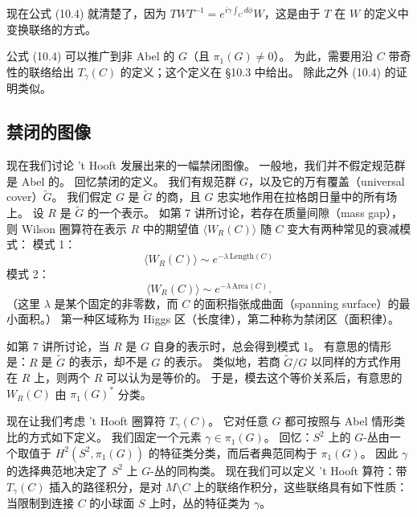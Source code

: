 现在公式 (10.4) 就清楚了，因为 $TWT^{-1}=e^{i\gamma\int_C d\phi}W$，这是由于 $T$ 在 $W$ 的定义中变换联络的方式。

公式 (10.4) 可以推广到非 Abel 的 $G$（且 $\pi_1(G)\neq0$）。
为此，需要用沿 $C$ 带奇性的联络给出 $T_\gamma(C)$ 的定义；这个定义在 §10.3 中给出。
除此之外 (10.4) 的证明类似。

\subsection{禁闭的图像}

现在我们讨论 't Hooft 发展出来的一幅禁闭图像。
一般地，我们并不假定规范群是 Abel 的。
回忆禁闭的定义。
我们有规范群 $G$，以及它的万有覆盖（universal cover）$\tilde G$。
我们假定 $G$ 是 $\tilde G$ 的商，且 $G$ 忠实地作用在拉格朗日量中的所有场上。
设 $R$ 是 $\tilde G$ 的一个表示。
如第 7 讲所讨论，若存在质量间隙（mass gap），则 Wilson 圈算符在表示 $R$ 中的期望值 $\langle W_R(C)\rangle$ 随 $C$ 变大有两种常见的衰减模式：
模式 1：
\begin{equation}\tag{10.8}\label{eq:10-8}
\langle W_R(C)\rangle\sim e^{-\lambda\,\mathrm{Length}(C)}
\end{equation}
模式 2：
\begin{equation}\tag{10.9}\label{eq:10-9}
\langle W_R(C)\rangle\sim e^{-\lambda\,\mathrm{Area}(C)}.
\end{equation}
（这里 $\lambda$ 是某个固定的非零数，而 $C$ 的面积指张成曲面（spanning surface）的最小面积。）
第一种区域称为 Higgs 区（长度律），第二种称为禁闭区（面积律）。


如第 7 讲所讨论，当 $R$ 是 $G$ 自身的表示时，总会得到模式 1。
有意思的情形是：$R$ 是 $\tilde G$ 的表示，却不是 $G$ 的表示。
类似地，若商 $\tilde G/G$ 以同样的方式作用在 $R$ 上，则两个 $R$ 可以认为是等价的。
于是，模去这个等价关系后，有意思的 $W_R(C)$ 由 $\pi_1(G)^*$ 分类。

现在让我们考虑 't Hooft 圈算符 $T_\gamma(C)$。
它对任意 $G$ 都可按照与 Abel 情形类比的方式如下定义。
我们固定一个元素 $\gamma\in\pi_1(G)$。
回忆：$S^2$ 上的 $G$-丛由一个取值于 $H^2(S^2,\pi_1(G))$ 的特征类分类，而后者典范同构于 $\pi_1(G)$。
因此 $\gamma$ 的选择典范地决定了 $S^2$ 上 $G$-丛的同构类。
现在我们可以定义 't Hooft 算符：带 $T_\gamma(C)$ 插入的路径积分，是对 $M\setminus C$ 上的联络作积分，这些联络具有如下性质：当限制到连接 $C$ 的小球面 $S$ 上时，丛的特征类为 $\gamma$。

